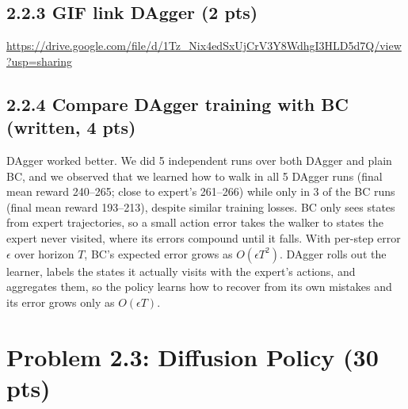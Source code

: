 \documentclass[12pt]{article}
\begin{document}
\subsection*{2.2.3 GIF link DAgger (2 pts)}

\begin{tcolorbox}[fit,height=5em, width=40em, blank, borderline={1pt}{1pt},nobeforeafter]
            \begin{solution}
            \url{https://drive.google.com/file/d/1Tz_Nix4edSxUjCrV3Y8WdhgI3HLD5d7Q/view?usp=sharing}
            \end{solution}

\end{tcolorbox}

\subsection*{2.2.4 Compare DAgger training with BC (written, 4 pts)}
\begin{tcolorbox}[fit,height=10em, width=40em, blank, borderline={1pt}{1pt},nobeforeafter]
            \begin{center}
            \begin{solution}
            \raggedright
DAgger worked better. We did 5 independent runs over both DAgger and plain BC, and we observed that we learned how to 
walk in all 5 DAgger runs (final mean reward 240–265; close to expert's 261–266) while only in 3 of the BC runs (final mean reward 193–213), despite similar training losses.
BC only sees states from expert trajectories, so a small action error takes the walker to states the expert never visited,
where its errors compound until it falls. With per-step error $\epsilon$ over horizon $T$, BC's expected error grows as $O(\epsilon T^2)$. DAgger rolls out the learner, labels the states it actually visits with the expert's actions,
and aggregates them, so the policy learns how to recover from its own mistakes and its error grows only as $O(\epsilon T)$.
            \end{solution}
            \end{center}
            \end{tcolorbox}

\newpage
\section*{Problem 2.3: Diffusion Policy (30 pts)}
\end{document}
